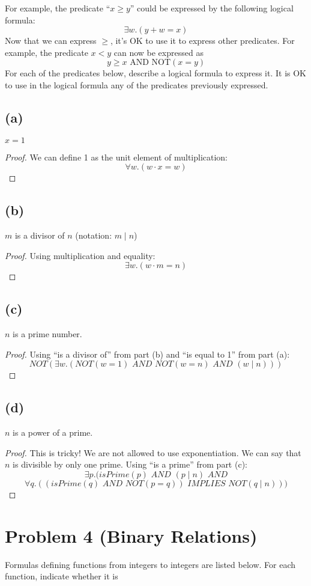 \documentclass[14pt]{extarticle}
\begin{document}
For example, the predicate ``$x \geq y$'' could be expressed by the following logical formula:
$$
\exists w.(y + w = x)
$$
Now that we can express $\geq$, it’s OK to use it to express other predicates. For example, the predicate $x < y$ can now be expressed as
$$
y \geq x \text{ AND NOT}(x = y)
$$
For each of the predicates below, describe a logical formula to express it. It is OK to use in the logical formula any of the predicates previously expressed.
\subsection{(a)}
$x = 1$
\begin{proof}
We can define 1 as the unit element of multiplication:
$$
\forall w.(w \cdot x = w)
$$
\end{proof}

\subsection{(b)}
$m$ is a divisor of $n$ (notation: $m \mid n$)
\begin{proof}
Using multiplication and equality:
$$
\exists w.(w \cdot m = n)
$$
\end{proof}

\subsection{(c)}
$n$ is a prime number.
\begin{proof}
Using ``is a divisor of'' from part (b) and ``is equal to 1'' from part (a):
$$
NOT(\exists w.(NOT(w = 1)\,\, AND \,\, NOT(w = n)\,\, AND \,\, (w \mid n)))
$$
\end{proof}

\subsection{(d)}
$n$ is a power of a prime.
\begin{proof}
This is tricky! We are not allowed to use exponentiation. We can say that $n$ is divisible by only one prime. Using ``is a prime'' from part (c):
$$
\exists p.(isPrime(p) \,\, AND \,\,(p \mid n) \,\, AND
$$
$$
\forall q.((isPrime(q) \,\, AND \,\, NOT(p = q)) \,\, IMPLIES \,\, NOT(q \mid n)))
$$
\end{proof}

\section{Problem 4 (Binary Relations)}
Formulas defining functions from integers to integers are listed below. For each function, indicate whether it is
\end{document}

